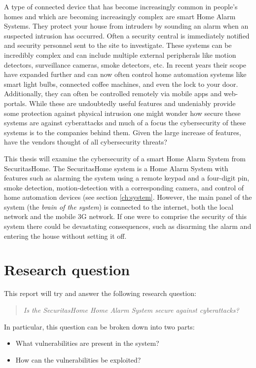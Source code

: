 A type of connected device that has become increasingly common in people's homes and which are becoming increasingly complex are smart Home Alarm Systems. They protect your house from intruders by sounding an alarm when an suspected intrusion has occurred. Often a security central is immediately notified and security personnel sent to the site to investigate. These systems can be incredibly complex and can include multiple external peripherals like motion detectors, surveillance cameras, smoke detectors, etc. In recent years their scope have expanded further and can now often control home automation systems like smart light bulbs, connected coffee machines, and even the lock to your door. Additionally, they can often be controlled remotely via mobile apps and web-portals. While these are undoubtedly useful features and undeniably provide some protection against physical intrusion one might wonder how secure these systems are against cyberattacks and much of a focus the cybersecurity of these systems is to the companies behind them. Given the large increase of features, have the vendors thought of all cybersecurity threats?

This thesis will examine the cybersecurity of a smart Home Alarm System from SecuritasHome. The SecuritasHome system is a Home Alarm System with features such as alarming the system using a remote keypad and a four-digit pin, smoke detection, motion-detection with a corresponding camera, and control of home automation devices (see section \ref{ch:system}. However, the main panel of the system (the \textit{brain of the system}) is connected to the internet, both the local network and the mobile 3G network. If one were to comprise the security of this system there could be devastating consequences, such as disarming the alarm and entering the house without setting it off.

\section{Research question} \label{ch:intro:research-question}
This report will try and answer the following research question:

\begin{quote}
    \textit{Is the SecuritasHome Home Alarm System secure against cyberattacks?}
\end{quote}

\noindent In particular, this question can be broken down into two parts:

\begin{itemize}
    \item What vulnerabilities are present in the system?
    \item How can the vulnerabilities be exploited?
\end{itemize}

